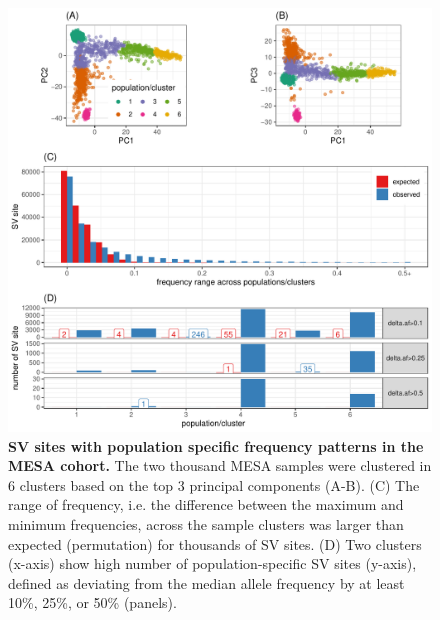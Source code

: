 \documentclass[11pt]{ucscthesis}
\begin{document}
\begin{figure}[H]
  \includegraphics[width=\linewidth]{fig-pops-freq-mesa.pdf}
  \caption[SV sites with population specific frequency patterns in the MESA cohort]{{\bf SV sites with population specific frequency patterns in the MESA cohort.}
    The two thousand MESA samples were clustered in 6 clusters based on the top 3 principal components (A-B).
    (C) The range of frequency, i.e. the difference between the maximum and minimum frequencies, across the sample clusters was larger than expected (permutation) for thousands of SV sites.
    (D) Two clusters (x-axis) show high number of population-specific SV sites (y-axis), defined as deviating from the median allele frequency by at least 10\%, 25\%, or 50\% (panels).}
  \label{fig:mesa-pop-freq}
\end{figure}
\end{document}
